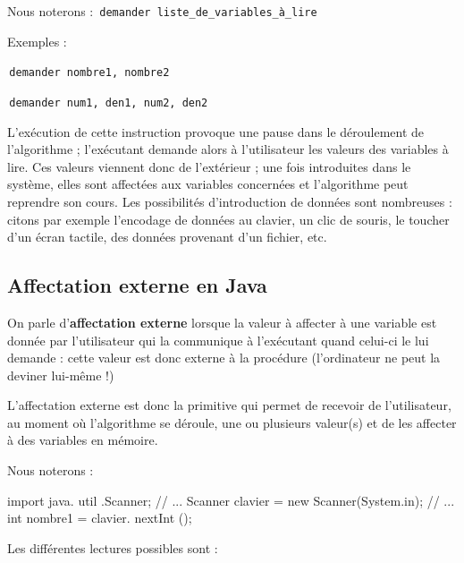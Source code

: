 \documentclass[11pt,a4paper]{article}
\begin{document}
          Nous noterons :
          \,\verb|demander liste_de_variables_à_lire|\,
            \par
        
          Exemples :\par
				\par
				\,\verb|demander nombre1, nombre2|\,\par
				\par
				\,\verb|demander num1, den1, num2, den2|\,
            \par
        
          L'ex\'ecution de cette instruction provoque une pause dans le d\'eroulement de l'algorithme ;
          l'ex\'ecutant demande alors \`a l'utilisateur les valeurs des variables \`a lire. Ces valeurs viennent
          donc de l'ext\'erieur ; une fois introduites dans le syst\`eme, elles sont affect\'ees aux variables
          concern\'ees et l'algorithme peut reprendre son cours. Les possibilit\'es d'introduction de donn\'ees
          sont nombreuses : citons par exemple l'encodage de donn\'ees au clavier, un clic de souris,
          le toucher d'un \'ecran tactile, des donn\'ees provenant d'un fichier, etc.
        
            \par
        \subsection{Affectation externe en Java}
          On parle d'\textbf{affectation externe} lorsque la valeur \`a affecter \`a une variable
           est donn\'ee par l'utilisateur qui la communique \`a l'ex\'ecutant quand celui-ci le lui demande : cette valeur est
          donc externe \`a la proc\'edure (l'ordinateur ne peut la deviner lui-m\^eme !)
        
            \par
        
          L'affectation externe est donc la primitive qui permet de recevoir de l'utilisateur, au moment
          o\`u l'algorithme se d\'eroule, une ou plusieurs valeur(s) et de les affecter \`a des variables en
          m\'emoire. 
        
            \par
        
          Nous noterons :
          
            \par
        \begin{Java}
import java. util .Scanner;
// ...
Scanner clavier = new Scanner(System.in);
// ...
int nombre1 = clavier. nextInt ();
				\end{Java}
          Les diff\'erentes lectures possibles sont :
          
\end{document}
